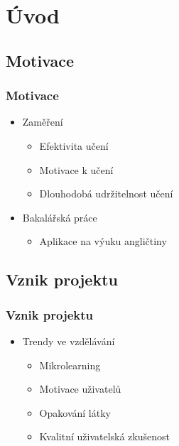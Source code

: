 \documentclass[a4paper]{beamer}
\author[\PersonTitle{} \FirstNameAbbreviated. \LastName]{\PersonTitle{} \FirstName{} \LastName}
\title{\DissertationTitle}
\date{11.~června~2026}
\begin{document}
\begin{frame}
\titlepage
\end{frame}

\section{Úvod}
\subsection*{Motivace}
\begin{frame}
\frametitle{Motivace}
\begin{itemize}
    \item Zaměření
    \begin{itemize}
        \item Efektivita učení
        \item Motivace k učení
        \item Dlouhodobá udržitelnost učení
    \end{itemize}
    \item Bakalářská práce
    \begin{itemize}
        \item Aplikace na výuku angličtiny
    \end{itemize}
\end{itemize}
\end{frame}

\subsection*{Vznik projektu}
\begin{frame}
\frametitle{Vznik projektu}
\begin{itemize}
    \item Trendy ve vzdělávání
    \begin{itemize}
        \item Mikrolearning %
        \item Motivace uživatelů %
        \item Opakování látky
        \item Kvalitní uživatelská zkušenost %
    \end{itemize}
\end{itemize}
\end{frame}
\end{document}
